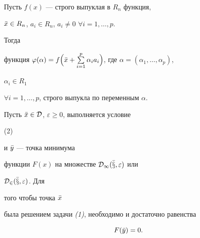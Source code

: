 \begin{lem}


Пусть $f(x)$ --- строго выпуклая в $R_n$ функция,


$\Bar x\in R_n$, $a_i\in R_n$, $a_i\ne 0$ $\forall i=1,\dotsc,p$.


Тогда


функция $\varphi(\alpha)=f\Bigl(\Bar x+\sum\limits^p_{i=1}


\alpha_i a_i\Bigr)$, где $\alpha=(\alpha_1,\dotsc,\alpha_p)$,


$\alpha_i\in R_1$


$\forall i=1,\dotsc,p$, строго выпукла по переменным $\alpha$.


\end{lem}





\begin{thm}


Пусть $\Bar x\in\cal D$, $\varepsilon\ge 0$, выполняется условие {\em


(2)} и $\Bar y$ --- точка минимума


функции $F(x)$ на множестве $\cal D_1(\Bar x,\varepsilon)$ или


$\cal D_2(\Bar x,\varepsilon)$. Для


того чтобы точка $\Bar x$


была решением задачи {\em (1)}, необходимо и достаточно равенства


\begin{equation}


F(\Bar y)=0.


\end{equation}


\end{thm}





